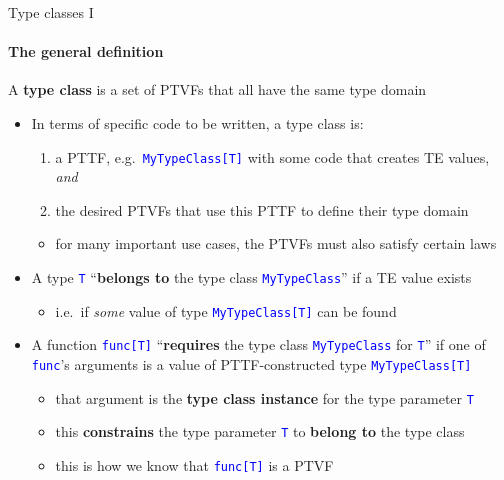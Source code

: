 \documentclass[english]{beamer}
\begin{document}
\begin{frame}{Type classes I}


\framesubtitle{The general definition}

A \textbf{type class} is a set of PTVFs that all have the same type
domain
\begin{itemize}
\item In terms of specific code to be written, a type class is:
\begin{enumerate}
\item a PTTF, e.g.\ \texttt{\textcolor{blue}{\footnotesize{}MyTypeClass{[}T{]}}}
with some code that creates TE values, \emph{and}
\item the desired PTVFs that use this PTTF to define their type domain
\end{enumerate}
\begin{itemize}
\item for many important use cases, the PTVFs must also satisfy certain
laws
\end{itemize}
\item A type \texttt{\textcolor{blue}{\footnotesize{}T}} ``\textbf{belongs
to} the type class \texttt{\textcolor{blue}{\footnotesize{}MyTypeClass}}''
if a TE value exists
\begin{itemize}
\item i.e.\ if \emph{some} value of type \texttt{\textcolor{blue}{\footnotesize{}MyTypeClass{[}T{]}}}
can be found
\end{itemize}
\item A function \texttt{\textcolor{blue}{\footnotesize{}func{[}T{]}}} ``\textbf{requires}
the type class \texttt{\textcolor{blue}{\footnotesize{}MyTypeClass}}
for \texttt{\textcolor{blue}{\footnotesize{}T}}'' if one of \texttt{\textcolor{blue}{\footnotesize{}func}}'s
arguments is a value of PTTF-constructed type \texttt{\textcolor{blue}{\footnotesize{}MyTypeClass{[}T{]}}}
\ 
\begin{itemize}
\item that argument is the \textbf{type class instance} for the type parameter
\texttt{\textcolor{blue}{\footnotesize{}T}}{\footnotesize \par}
\item this \textbf{constrains} the type parameter \texttt{\textcolor{blue}{\footnotesize{}T}}
to \textbf{belong to} the type class
\item this is how we know that \texttt{\textcolor{blue}{\footnotesize{}func{[}T{]}}}
is a PTVF
\end{itemize}
\end{itemize}
\end{frame}
\end{document}
